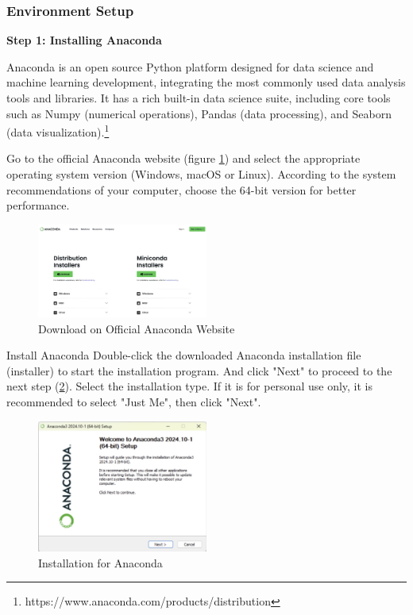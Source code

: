\begin{ZhChapter}
    \subsubsection{Environment Setup}

    \textbf{Step 1: Installing Anaconda}

    Anaconda is an open source Python platform designed for data science and machine learning development, integrating the most commonly used data analysis tools and libraries. It has a rich built-in data science suite, including core tools such as Numpy (numerical operations), Pandas (data processing), and Seaborn (data visualization).\footnote{https://www.anaconda.com/products/distribution}

    Go to the official Anaconda website (figure \ref{fig: DownloadAnaconda}) and select the appropriate operating system version (Windows, macOS or Linux).
    According to the system recommendations of your computer, choose the 64-bit version for better performance.
    \begin{figure}[htbp]
        \centering
        \includegraphics[width = 0.5\textwidth]{image/DownloadAnaconda.jpg}
        \caption{Download on Official Anaconda Website}
        \label{fig: DownloadAnaconda}
    \end{figure}

    Install Anaconda
    Double-click the downloaded Anaconda installation file (installer) to start the installation program. And click "Next" to proceed to the next step (\ref{fig: InstallAnaconda}).
    Select the installation type. If it is for personal use only, it is recommended to select "Just Me", then click "Next".
    \begin{figure}[htbp]
        \centering
        \includegraphics[width = 0.5\textwidth]{image/InstallAnaconda.jpg}
        \caption{Installation for Anaconda}
        \label{fig: InstallAnaconda}
    \end{figure}


\end{ZhChapter}
